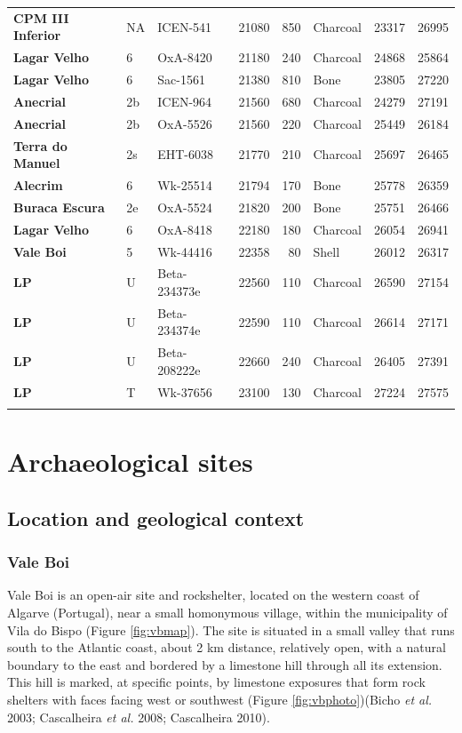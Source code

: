 \documentclass[12pt,twoside]{reedthesis}
\begin{document}
\begin{landscape}
\begin{longtable}[t]{>{\bfseries}lllrrlrr}
CPM III Inferior & NA & ICEN-541 & 21080 & 850 & Charcoal & 23317 & 26995\\
Lagar Velho & 6 & OxA-8420 & 21180 & 240 & Charcoal & 24868 & 25864\\
Lagar Velho & 6 & Sac-1561 & 21380 & 810 & Bone & 23805 & 27220\\
\addlinespace
Anecrial & 2b & ICEN-964 & 21560 & 680 & Charcoal & 24279 & 27191\\
Anecrial & 2b & OxA-5526 & 21560 & 220 & Charcoal & 25449 & 26184\\
Terra do Manuel & 2s & EHT-6038 & 21770 & 210 & Charcoal & 25697 & 26465\\
Alecrim & 6 & Wk-25514 & 21794 & 170 & Bone & 25778 & 26359\\
Buraca Escura & 2e & OxA-5524 & 21820 & 200 & Bone & 25751 & 26466\\
\addlinespace
Lagar Velho & 6 & OxA-8418 & 22180 & 180 & Charcoal & 26054 & 26941\\
Vale Boi & 5 & Wk-44416 & 22358 & 80 & Shell & 26012 & 26317\\
LP & U & Beta-234373e & 22560 & 110 & Charcoal & 26590 & 27154\\
LP & U & Beta-234374e & 22590 & 110 & Charcoal & 26614 & 27171\\
LP & U & Beta-208222e & 22660 & 240 & Charcoal & 26405 & 27391\\
\addlinespace
LP & T & Wk-37656 & 23100 & 130 & Charcoal & 27224 & 27575\\*
\end{longtable}
\endgroup{}
\end{landscape}
\hypertarget{archaeological-sites}{%
\chapter{Archaeological sites}\label{archaeological-sites}}

\hypertarget{location-and-geological-context}{%
\section{Location and geological context}\label{location-and-geological-context}}

\hypertarget{vale-boi}{%
\subsection{Vale Boi}\label{vale-boi}}

Vale Boi is an open-air site and rockshelter, located on the western coast of Algarve (Portugal), near a small homonymous village, within the municipality of Vila do Bispo (Figure \ref{fig:vbmap}). The site is situated in a small valley that runs south to the Atlantic coast, about 2 km distance, relatively open, with a natural boundary to the east and bordered by a limestone hill through all its extension. This hill is marked, at specific points, by limestone exposures that form rock shelters with faces facing west or southwest (Figure \ref{fig:vbphoto})(Bicho \emph{et al.} 2003; Cascalheira \emph{et al.} 2008; Cascalheira 2010).
\end{document}
